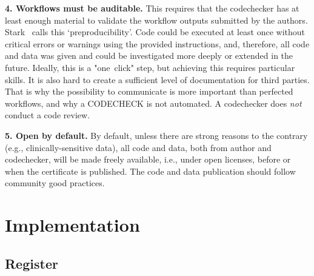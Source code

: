 \documentclass[12pt]{article}
\begin{document}
\textbf{4. Workflows must be auditable.} This requires that the codechecker 
has at least enough material to validate the workflow outputs submitted by 
the authors. Stark~\cite{stark_before_2018} calls this `preproducibility'.
Code could be executed at least once without critical errors or
warnings using the provided instructions, and, therefore, all code and data 
was given and could be investigated more deeply or extended in the future.
Ideally, this is a "one~click" step, but achieving this requires particular 
skills. It is also hard to create a sufficient level of documentation for 
third parties. That is why the possibility to communicate is more important
than perfected workflows, and why a CODECHECK is not automated.
A codechecker does \emph{not} conduct a code review.

\textbf{5. Open by default.}  By default, unless there are strong
reasons to the contrary (e.g., clinically-sensitive data), all code and
data, both from author and codechecker, will be made freely available, i.e., 
under open licenses, before or when the certificate is published.
The code and data  publication should follow community good practices.

\section*{Implementation}\label{register}

\subsection*{Register}\label{register}
\end{document}
